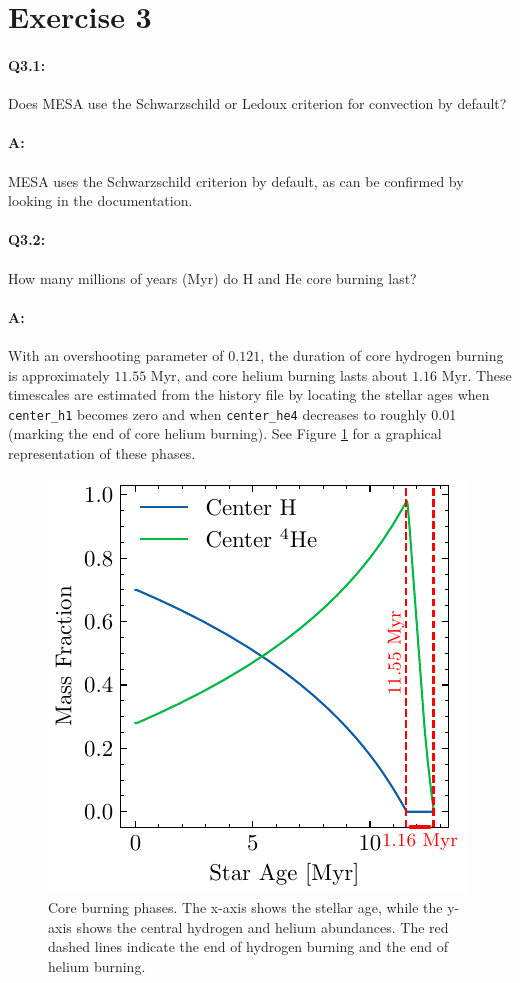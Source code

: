\documentclass[twocolumn,fontsize=11pt]{scrartcl}
\begin{document}
\section*{Exercise 3}

\paragraph{Q3.1:} Does MESA use the Schwarzschild or Ledoux criterion for convection by default? 

\paragraph{A:} MESA uses the Schwarzschild criterion by default, as can be confirmed by looking in the documentation. 

\paragraph{Q3.2:} How many millions of years (Myr) do H and He core burning last?

\paragraph{A:} With an overshooting parameter of \(0.121\), the duration of core hydrogen burning is approximately \(11.55\) Myr, and core helium burning lasts about \(1.16\) Myr. These timescales are estimated from the history file by locating the stellar ages when \texttt{center\_h1} becomes zero and when \texttt{center\_he4} decreases to roughly 0.01 (marking the end of core helium burning). See Figure \ref{fig:q31_core_burning} for a graphical representation of these phases.
\begin{figure}[htbp]
    \centering
    \includegraphics{q31center_h_he.pdf}
    \caption{Core burning phases. The x-axis shows the stellar age, while the y-axis shows the central hydrogen and helium abundances. The red dashed lines indicate the end of hydrogen burning and the end of helium burning.}
    \label{fig:q31_core_burning} 
\end{figure}   
\end{document}
